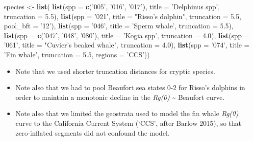 \documentclass[
]{book}
\newenvironment{Shaded}{\begin{snugshade}}{\end{snugshade}}
\newcommand{\DataTypeTok}[1]{\textcolor[rgb]{0.13,0.29,0.53}{#1}}
\newcommand{\FloatTok}[1]{\textcolor[rgb]{0.00,0.00,0.81}{#1}}
\newcommand{\KeywordTok}[1]{\textcolor[rgb]{0.13,0.29,0.53}{\textbf{#1}}}
\newcommand{\NormalTok}[1]{#1}
\newcommand{\StringTok}[1]{\textcolor[rgb]{0.31,0.60,0.02}{#1}}
\begin{document}
\begin{Shaded}
\begin{Highlighting}[]
\NormalTok{species <-}\StringTok{ }\KeywordTok{list}\NormalTok{(}
  \KeywordTok{list}\NormalTok{(}\DataTypeTok{spp =} \KeywordTok{c}\NormalTok{(}\StringTok{'005'}\NormalTok{, }\StringTok{'016'}\NormalTok{, }\StringTok{'017'}\NormalTok{),}
       \DataTypeTok{title =} \StringTok{'Delphinus spp'}\NormalTok{,}
       \DataTypeTok{truncation =} \FloatTok{5.5}\NormalTok{),}
  \KeywordTok{list}\NormalTok{(}\DataTypeTok{spp =} \StringTok{'021'}\NormalTok{,}
       \DataTypeTok{title =} \StringTok{"Risso's dolphin"}\NormalTok{,}
       \DataTypeTok{truncation =} \FloatTok{5.5}\NormalTok{, }
       \DataTypeTok{pool_bft =} \StringTok{'12'}\NormalTok{),}
  \KeywordTok{list}\NormalTok{(}\DataTypeTok{spp =} \StringTok{'046'}\NormalTok{,}
       \DataTypeTok{title =} \StringTok{'Sperm whale'}\NormalTok{,}
       \DataTypeTok{truncation =} \FloatTok{5.5}\NormalTok{),}
  \KeywordTok{list}\NormalTok{(}\DataTypeTok{spp =} \KeywordTok{c}\NormalTok{(}\StringTok{'047'}\NormalTok{, }\StringTok{'048'}\NormalTok{, }\StringTok{'080'}\NormalTok{),}
       \DataTypeTok{title =} \StringTok{'Kogia spp'}\NormalTok{,}
       \DataTypeTok{truncation =} \FloatTok{4.0}\NormalTok{),}
  \KeywordTok{list}\NormalTok{(}\DataTypeTok{spp =} \StringTok{'061'}\NormalTok{,}
       \DataTypeTok{title =} \StringTok{"Cuvier's beaked whale"}\NormalTok{,}
       \DataTypeTok{truncation =} \FloatTok{4.0}\NormalTok{),}
  \KeywordTok{list}\NormalTok{(}\DataTypeTok{spp =} \StringTok{'074'}\NormalTok{,}
       \DataTypeTok{title =} \StringTok{'Fin whale'}\NormalTok{,}
       \DataTypeTok{truncation =} \FloatTok{5.5}\NormalTok{,}
       \DataTypeTok{regions =} \StringTok{'CCS'}\NormalTok{))}
\end{Highlighting}
\end{Shaded}

\begin{itemize}
\item
  Note that we used shorter truncation distances for cryptic species.
\item
  Note also that we had to pool Beaufort sea states 0-2 for Risso's dolphins in order to maintain a monotonic decline in the \emph{Rg(0)} \textasciitilde{} Beaufort curve.
\item
  Note also that we limited the geostrata used to model the fin whale \emph{Rg(0)} curve to the California Current System (`CCS', after Barlow 2015), so that zero-inflated segments did not confound the model.
\end{itemize}
\end{document}
